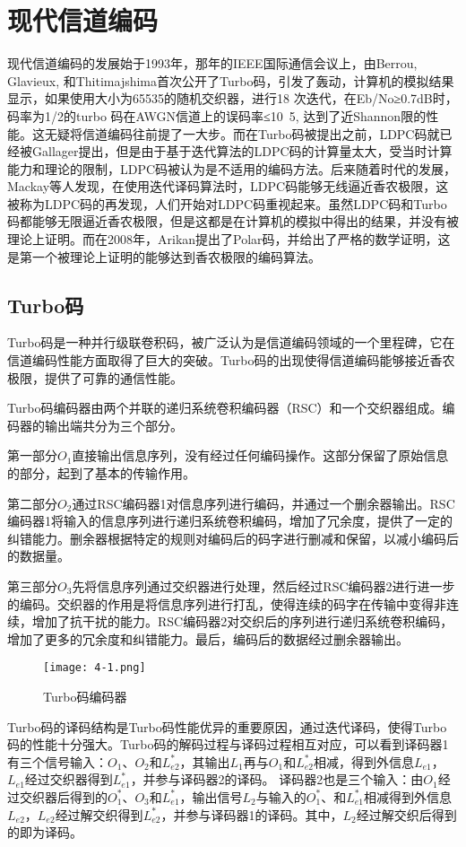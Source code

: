 \documentclass{article}
\begin{document}
\section{现代信道编码}
现代信道编码的发展始于1993年，那年的IEEE国际通信会议上，由Berrou, Glavieux, 和Thitimajshima首次公开了Turbo码，引发了轰动，计算机的模拟结果显示，如果使用大小为65535的随机交织器，进行18 次迭代，在Eb/No≥0.7dB时，码率为1/2的turbo 码在AWGN信道上的误码率≤10~5, 达到了近Shannon限的性能。\cite{berrou1993near}这无疑将信道编码往前提了一大步。而在Turbo码被提出之前，LDPC码就已经被Gallager提出，但是由于基于迭代算法的LDPC码的计算量太大，受当时计算能力和理论的限制，LDPC码被认为是不适用的编码方法。后来随着时代的发展，Mackay等人发现，在使用迭代译码算法时，LDPC码能够无线逼近香农极限，这被称为LDPC码的再发现，人们开始对LDPC码重视起来。虽然LDPC码和Turbo码都能够无限逼近香农极限，但是这都是在计算机的模拟中得出的结果，并没有被理论上证明。而在2008年，Arikan提出了Polar码，并给出了严格的数学证明，这是第一个被理论上证明的能够达到香农极限的编码算法。

\subsection{Turbo码}
Turbo码是一种并行级联卷积码，被广泛认为是信道编码领域的一个里程碑，它在信道编码性能方面取得了巨大的突破。Turbo码的出现使得信道编码能够接近香农极限，提供了可靠的通信性能。

Turbo码编码器由两个并联的递归系统卷积编码器（RSC）和一个交织器组成。编码器的输出端共分为三个部分。

第一部分$O_1$直接输出信息序列，没有经过任何编码操作。这部分保留了原始信息的部分，起到了基本的传输作用。

第二部分$O_2$通过RSC编码器1对信息序列进行编码，并通过一个删余器输出。RSC编码器1将输入的信息序列进行递归系统卷积编码，增加了冗余度，提供了一定的纠错能力。删余器根据特定的规则对编码后的码字进行删减和保留，以减小编码后的数据量。

第三部分$O_3$先将信息序列通过交织器进行处理，然后经过RSC编码器2进行进一步的编码。交织器的作用是将信息序列进行打乱，使得连续的码字在传输中变得非连续，增加了抗干扰的能力。RSC编码器2对交织后的序列进行递归系统卷积编码，增加了更多的冗余度和纠错能力。最后，编码后的数据经过删余器输出。

\begin{figure}[h]
  \centering
  \texttt{[image: 4-1.png]}
  \caption{Turbo码编码器}
\end{figure}

Turbo码的译码结构是Turbo码性能优异的重要原因，通过迭代译码，使得Turbo码的性能十分强大。Turbo码的解码过程与译码过程相互对应，可以看到译码器1有三个信号输入：$O_1$、$O_2$和$L_{e2}^*$，其输出$L_1$再与$O_1$和$L_{e2}^*$相减，得到外信息$L_{e1}$，$L_{e1}$经过交织器得到$L_{e1}^*$，并参与译码器2的译码。
译码器2也是三个输入：由$O_1$经过交织器后得到的$O_1^*$、$O_3$和$L_{e1}^*$，输出信号$L_2$与输入的$O_1^*$、和$L_{e1}^*$相减得到外信息$L_{e2}$，$L_{e2}$经过解交织得到$L_{e2}^*$，并参与译码器1的译码。其中，$L_2$经过解交织后得到的即为译码。
\end{document}
